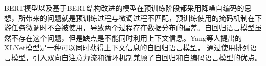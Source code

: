 BERT模型以及基于BERT结构改进的模型在预训练阶段都采用降噪自编码的思想，所带来的问题就是预训练过程与微调过程不匹配，预训练使用的掩码机制在下游任务微调时不会被使用，导致两个过程存在数据分布的偏差。自回归语言模型虽然不存在这个问题，但是缺点是不能同时利用上下文信息。Yang等人提出的XLNet模型是一种可以同时获得上下文信息的自回归语言模型，
通过使用排列语言模型，引入双向自注意力流和循环机制兼顾了自回归和自编码语言模型的优点。

%






%
%




